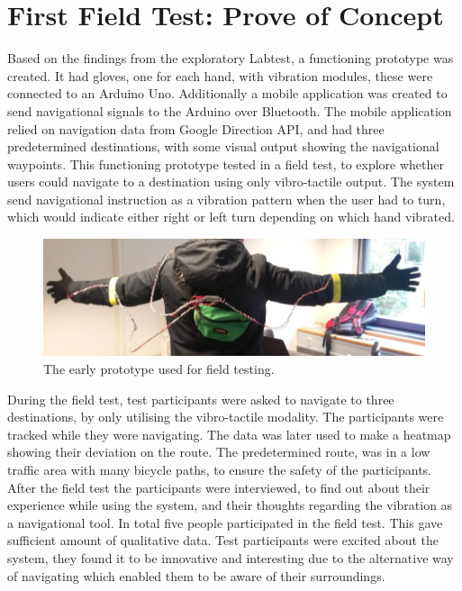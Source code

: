 \documentclass{sigchi}
\begin{document}
\section{First Field Test: Prove of Concept}
Based on the findings from the exploratory Labtest, a functioning prototype was created. It had gloves, one for each hand, with vibration modules, these were connected to an Arduino Uno. Additionally a mobile application was created to send navigational signals to the Arduino over Bluetooth. The mobile application relied on navigation data from Google Direction API, and had three predetermined destinations, with some visual output showing the navigational waypoints. 
\newline
\newline
This functioning prototype tested in a field test, to explore whether users could navigate to a destination using only vibro-tactile output. The system send navigational instruction as a vibration pattern when the user had to turn, which would indicate either right or left turn depending on which hand vibrated. 
\begin{figure}
\centering
\includegraphics[width=1.01\columnwidth]{figures/enitial_prototype.png}
\caption{The early prototype used for field testing.}
\label{fig:enitial_prototype}
\end{figure} 
During the field test, test participants were asked to navigate to three destinations, by only utilising the vibro-tactile modality. The participants were tracked while they were navigating. The data was later used to make a heatmap showing their deviation on the route. The predetermined route, was in a low traffic area with many bicycle paths, to ensure the safety of the participants. 
\newline
\newline 
After the field test the participants were interviewed, to find out about their experience while using the system, and their thoughts regarding the vibration as a navigational tool. 
\newline
\newline  
In total five people participated in the field test. This gave sufficient amount of qualitative data. Test participants were excited about the system, they found it to be innovative and interesting due to the alternative way of navigating which enabled them to be aware of their surroundings.
\end{document}
